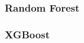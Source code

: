 \documentclass[12pt,a4paper,oneside]{article}
\begin{document}


\subsubsection{Random Forest}\label{subsubsec:rf}

%


\subsubsection{XGBoost}\label{subsubsec:xgb}

%
%
%
\end{document}
